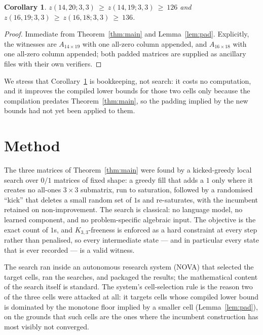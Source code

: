 \documentclass[11pt,reqno]{amsart}
\theoremstyle{plain}
\newtheorem{corollary}[theorem]{Corollary}
\theoremstyle{remark}
\newcommand{\zz}{z}
\begin{document}
\begin{corollary}\label{cor:pad}
$\zz(14,20;3,3)\ \ge\ \zz(14,19;3,3)\ \ge\ 126$ and
$\zz(16,19;3,3)\ \ge\ \zz(16,18;3,3)\ \ge\ 136$.
\end{corollary}

\begin{proof}
Immediate from Theorem~\ref{thm:main} and Lemma~\ref{lem:pad}. Explicitly, the witnesses are
$A_{14\times19}$ with one all-zero column appended, and $A_{16\times18}$ with one all-zero column
appended; both padded matrices are supplied as ancillary files with their own verifiers.
\end{proof}

We stress that Corollary~\ref{cor:pad} is bookkeeping, not search: it costs no computation, and it
improves the compiled lower bounds for those two cells only because the compilation predates
Theorem~\ref{thm:main}, so the padding implied by the new bounds had not yet been applied to them.

\section{Method}

The three matrices of Theorem~\ref{thm:main} were found by a kicked-greedy local search over $0/1$
matrices of fixed shape: a greedy fill that adds a $1$ only where it creates no all-ones $3\times 3$
submatrix, run to saturation, followed by a randomised ``kick'' that deletes a small random set of
$1$s and re-saturates, with the incumbent retained on non-improvement. The search is classical: no
language model, no learned component, and no problem-specific algebraic input. The objective is the
exact count of $1$s, and $K_{3,3}$-freeness is enforced as a hard constraint at every step rather
than penalised, so every intermediate state --- and in particular every state that is ever recorded
--- is a valid witness.

The search ran inside an autonomous research system (NOVA) that selected the target cells, ran the
searches, and packaged the results; the mathematical content of the search itself is standard. The
system's cell-selection rule is the reason two of the three cells were attacked at all: it targets
cells whose compiled lower bound is dominated by the monotone floor implied by a smaller cell
(Lemma~\ref{lem:pad}), on the grounds that such cells are the ones where the incumbent construction
has most visibly not converged.
\end{document}
